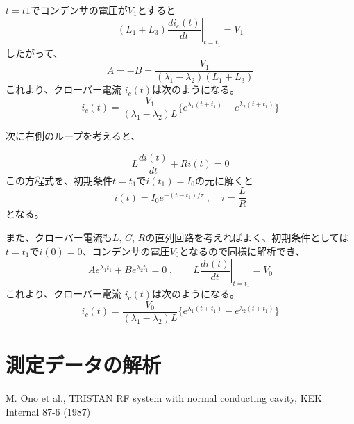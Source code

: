 \documentclass[book,openany]{jlreq}
\theoremstyle{definition}
\begin{document}
%
$t=t1$でコンデンサの電圧が$V_1$とすると
%
\begin{equation}
  (L_1+L_3)\left. \frac{di_c(t)}{dt} \right|_{t=t_1}= V_1
\end{equation}
%
したがって、
\begin{equation}
  A = -B = \frac{V_1}{(\lambda_1 - \lambda_2)(L_1+L_3)}
\end{equation}
%
%
これより、クローバー電流 $i_c(t)$は次のようになる。
\begin{equation}
  i_c(t) = \frac{V_1}{(\lambda_1-\lambda_2)L}\bigl\{e^{\lambda_1(t+t_1)}-e^{\lambda_2(t+t_1)}\bigr\}
\end{equation}

次に右側のループを考えると、



\begin{equation}
  L \frac{di(t)}{dt} + R i(t) = 0
\end{equation}
%
この方程式を、初期条件$t=t_1$で$i(t_1)=I_0$の元に解くと
%
\begin{equation}
  i(t) = I_0 e^{-(t-t_1)/\tau}\;,\quad \tau = \frac{L}{R}
\end{equation}
%
となる。

また、クローバー電流も$L$, $C$, $R$の直列回路を考えればよく、初期条件としては$t=t_1$で$i(0)=0$、コンデンサの電圧$V_0$となるので同様に解析でき、
%
\begin{equation}
  A e^{\lambda_1 t_1}+B e^{\lambda_2 t_1} = 0\;,\qquad L\left .\frac{di(t)}{dt} \right|_{t=t_1}=V_0
\end{equation}
%
これより、クローバー電流 $i_c(t)$は次のようになる。
\begin{equation}
  i_c(t) = \frac{V_0}{(\lambda_1-\lambda_2)L}\bigl\{e^{\lambda_1(t+t_1)}-e^{\lambda_2(t+t_1)}\bigr\}
\end{equation}
%
\chapter{測定データの解析}


\begin{thebibliography}{9}
  M. Ono et al., TRISTAN RF system with normal conducting cavity, KEK Internal 87-6 (1987)
\end{thebibliography}
%
\end{document}
